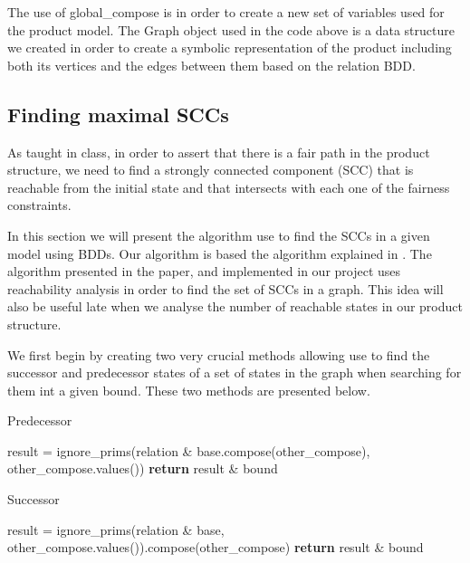 \documentclass[11pt]{article}
\begin{document}
        The use of global\_compose is in order to create a new set of variables
        used for the product model. The Graph object used in the code above is
        a data structure we created in order to create a symbolic representation
        of the product including both its vertices and the edges between them
        based on the relation BDD.

    \subsection{Finding maximal SCCs}
        As taught in class, in order to assert that there is a fair path in the 
        product structure, we need to find a strongly connected component (SCC)
        that is reachable from the initial state and that intersects with
        each one of the fairness constraints.
        
        In this section we will present the algorithm use to find the SCCs in
        a given model using BDDs. Our algorithm is based the algorithm explained
        in \cite{scc}. The algorithm presented in the paper, and implemented in
        our project uses reachability analysis in order to find the set of SCCs
        in a graph. This idea will also be useful late when we analyse the number
        of reachable states in our product structure.

        We first begin by creating two very crucial methods allowing use to find
        the successor and predecessor states of a set of states in the graph when
        searching for them int a given bound. These two methods are presented 
        below.

        \begin{multicols}{2}
        \begin{algorithm}[H]
            \caption{Predecessor}\label{predecessor}
                \State result = ignore\_prims(relation \& base.compose(other\_compose), other\_compose.values())
                \State \textbf{return} result & bound
            \EndProcedure
        \end{algorithm}
        \begin{algorithm}[H]
            \caption{Successor}\label{successor}
                \State result = ignore\_prims(relation \& base, other\_compose.values()).compose(other\_compose)
                \State \textbf{return} result & bound
            \EndProcedure
        \end{algorithm}
        \end{multicols}
\end{document}
